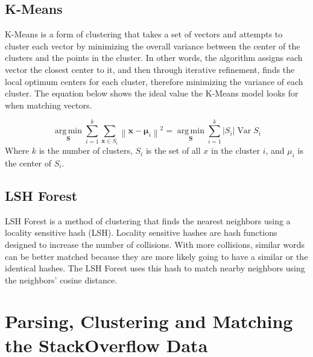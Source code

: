 \documentclass[9pt,twocolumn,twoside]{idsi}
\begin{document}
\subsection{K-Means}
K-Means is a form of clustering that takes a set of vectors and attempts to cluster each vector by minimizing the overall variance between the center of the clusters and the points in the cluster. In other words, the algorithm assigns each vector the closest center to it, and then through iterative refinement, finds the local optimum centers for each cluster, therefore minimizing the variance of each cluster. The equation below shows the ideal value the K-Means model looks for when matching vectors.

\begin{equation}
{\displaystyle {\underset {\mathbf {S} }{\operatorname {arg\,min} }}\sum _{i=1}^{k}\sum _{\mathbf {x} \in S_{i}}\left\|\mathbf {x} -{\boldsymbol {\mu }}_{i}\right\|^{2}={\underset {\mathbf {S} }{\operatorname {arg\,min} }}\sum _{i=1}^{k}|S_{i}|\operatorname {Var} S_{i}} 
\end{equation}
Where $k$ is the number of clusters, $S_{i}$ is the set of all $x$ in the cluster $i$, and $\mu _{i}$ is the center of $S_{i}$. 

\subsection{LSH Forest}
LSH Forest is a method of clustering that finds the nearest neighbors using a locality sensitive hash (LSH). Locality sensitive hashes are hash functions designed to increase the number of collisions. With more collisions, similar words can be better matched because they are more likely going to have a similar or the identical hashes. The LSH Forest uses this hash to match nearby neighbors using the neighbors' cosine distance.

\section{Parsing, Clustering and Matching the StackOverflow Data}
\end{document}
